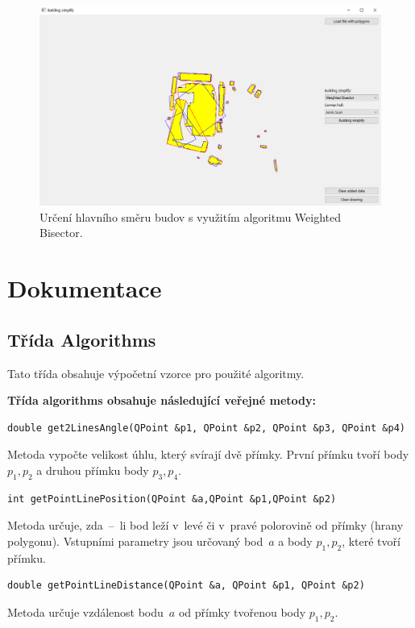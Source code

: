 \documentclass[a4paper, 12pt, oneside, titlepage]{article} %
\begin{document}
\begin{figure}[!htb]
	\centering
	\includegraphics[scale=0.5]{obrazky/weig_bi.png} 
	\caption{Určení hlavního směru budov s využitím algoritmu Weighted Bisector.
	}
	\label{fig:weig_bi}
\end{figure} 
\FloatBarrier

\section{Dokumentace}
\subsection{Třída Algorithms}
Tato třída obsahuje výpočetní vzorce pro použité algoritmy.

\textbf{Třída algorithms obsahuje následující veřejné metody:}

\begin{verbatim}
double get2LinesAngle(QPoint &p1, QPoint &p2, QPoint &p3, QPoint &p4)
\end{verbatim}
Metoda vypočte velikost úhlu, který svírají dvě přímky. První přímku tvoří body $p_1, p_2$ a druhou přímku body $p_3, p_4$.\\

\begin{verbatim}
int getPointLinePosition(QPoint &a,QPoint &p1,QPoint &p2)
\end{verbatim}
Metoda určuje, zda~--~li bod leží v~levé či v~pravé polorovině od přímky (hrany polygonu). Vstupními parametry jsou určovaný bod~$a$ a body $p_1, p_2$, které tvoří přímku.\\

\begin{verbatim}
double getPointLineDistance(QPoint &a, QPoint &p1, QPoint &p2)
\end{verbatim}
Metoda určuje vzdálenost bodu~$a$ od přímky tvořenou body $p_1, p_2$.\\
\end{document}
